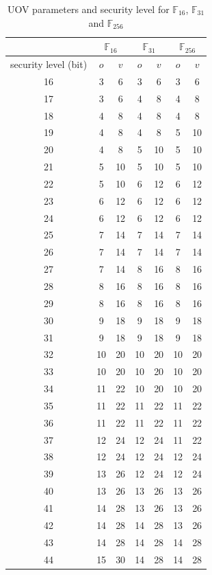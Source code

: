 \begin{table}
\centering
\caption{UOV parameters and security level for $\mathbb{F}_{16}$, $\mathbb{F}_{31}$ and $\mathbb{F}_{256}$}
\label{table:security_level_uov}
\begin{tabular}{|c|c|c|c|c|c|c|}
\hline
\multicolumn{1}{|c|}{}                     & \multicolumn{2}{c|}{$\mathbb{F}_{16}$}            & \multicolumn{2}{c|}{$\mathbb{F}_{31}$}            & \multicolumn{2}{c|}{$\mathbb{F}_{256}$}           \\ \hline
\multicolumn{1}{|c|}{security level (bit)} & \multicolumn{1}{c|}{$o$} & \multicolumn{1}{c|}{$v$} & \multicolumn{1}{c|}{$o$} & \multicolumn{1}{c|}{$v$} & \multicolumn{1}{c|}{$o$} & \multicolumn{1}{c|}{$v$} \\ \hline
16 & 3 & 6 & 3 & 6 & 3 & 6 \\ \hline
17 & 3 & 6 & 4 & 8 & 4 & 8 \\ \hline
18 & 4 & 8 & 4 & 8 & 4 & 8 \\ \hline
19 & 4 & 8 & 4 & 8 & 5 & 10 \\ \hline
20 & 4 & 8 & 5 & 10 & 5 & 10 \\ \hline
21 & 5 & 10 & 5 & 10 & 5 & 10 \\ \hline
22 & 5 & 10 & 6 & 12 & 6 & 12 \\ \hline
23 & 6 & 12 & 6 & 12 & 6 & 12 \\ \hline
24 & 6 & 12 & 6 & 12 & 6 & 12 \\ \hline
25 & 7 & 14 & 7 & 14 & 7 & 14 \\ \hline
26 & 7 & 14 & 7 & 14 & 7 & 14 \\ \hline
27 & 7 & 14 & 8 & 16 & 8 & 16 \\ \hline
28 & 8 & 16 & 8 & 16 & 8 & 16 \\ \hline
29 & 8 & 16 & 8 & 16 & 8 & 16 \\ \hline
30 & 9 & 18 & 9 & 18 & 9 & 18 \\ \hline
31 & 9 & 18 & 9 & 18 & 9 & 18 \\ \hline
32 & 10 & 20 & 10 & 20 & 10 & 20 \\ \hline
33 & 10 & 20 & 10 & 20 & 10 & 20 \\ \hline
34 & 11 & 22 & 10 & 20 & 10 & 20 \\ \hline
35 & 11 & 22 & 11 & 22 & 11 & 22 \\ \hline
36 & 11 & 22 & 11 & 22 & 11 & 22 \\ \hline
37 & 12 & 24 & 12 & 24 & 11 & 22 \\ \hline
38 & 12 & 24 & 12 & 24 & 12 & 24 \\ \hline
39 & 13 & 26 & 12 & 24 & 12 & 24 \\ \hline
40 & 13 & 26 & 13 & 26 & 13 & 26 \\ \hline
41 & 14 & 28 & 13 & 26 & 13 & 26 \\ \hline
42 & 14 & 28 & 14 & 28 & 13 & 26 \\ \hline
43 & 14 & 28 & 14 & 28 & 14 & 28 \\ \hline
44 & 15 & 30 & 14 & 28 & 14 & 28 \\ \hline
\end{tabular}
\end{table}

